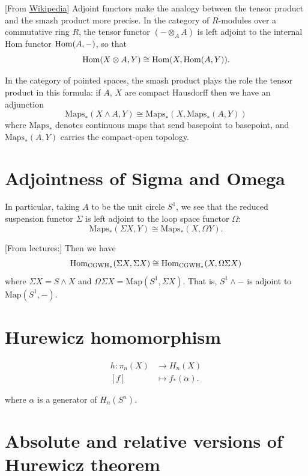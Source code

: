 [From
\href{https://en.wikipedia.org/wiki/%
Smash_product#}{Wikipedia}]
Adjoint functors make the analogy between the
tensor product
and the smash product more
precise. In the category of $R$-modules over
a commutative ring $R$, the tensor
functor $(-\otimes_{A} A)$ is left adjoint to
the internal Hom functor
$\mathop{\mathrm{Hom}}\nolimits(A,-)$, so that
$$
\mathop{\mathrm{Hom}}\nolimits(X\otimes A,Y)\cong\mathop{\mathrm{Hom}}\nolimits(X,\mathop{\mathrm{Hom}}\nolimits(A,Y)).
$$

In the category of pointed spaces, the smash
product plays the role the tensor product in
this formula: if $A$, $X$ are compact
Hausdorff then we have an adjunction
$$\text{Maps}_{*}(X\wedge A,Y)\cong
\text{Maps}_{*}(X,\text{Maps}_{*}(A,Y))$$
where $\text{Maps}_{*}$ denotes continuous
maps that send basepoint to basepoint, and
$\text{Maps}_{*}(A,Y)$ carries the
compact-open topology.

\section{Adjointness of Sigma and Omega}
\label{section-adjointness-of-and}
In particular, taking $A$ to be the unit
circle $S^{1}$, we see that the reduced
suspension functor $\Sigma$ is left adjoint
to the loop space functor $\Omega$:
$$\text{Maps}_{*}(\Sigma X,Y)\cong
\text{Maps}_{*}(X,\Omega Y).$$

[From lectures:] Then we have
$$\mathop{\mathrm{Hom}}\nolimits_{\text{CGWH}_*}(\Sigma X,\Sigma
X)\cong\mathop{\mathrm{Hom}}\nolimits_{\text{CGWH}_*}(X,\Omega\Sigma
X)$$
where $\Sigma X=S\wedge X$ and $\Omega\Sigma
X=\text{Map}(S^1,\Sigma X)$. That is,
$S^1\wedge-$ is adjoint to
$\text{Map}(S^1,-)$.

\section{Hurewicz homomorphism}
\label{section-hurewicz-homomorphism}

\begin{definition}
\label{definition-hurewicz-homomorphism}
$$
\begin{aligned}
h: \pi_{n}(X) &\longrightarrow H_{n}(X) \\
[f] &\longmapsto f_{*}(\alpha)
.\end{aligned}
$$
\end{definition}
where $\alpha$ is a generator of $
H_{n}(S^{n})$.

\section{Absolute and relative versions of
Hurewicz theorem}
\label{section-absol-relat-hurew-theor}

